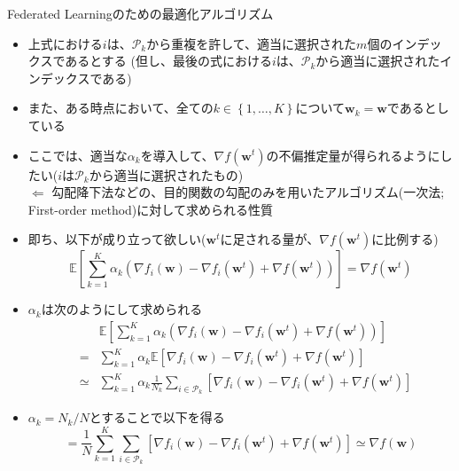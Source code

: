 \documentclass[dvipdfmx,notheorems,t]{beamer}
\begin{document}
\begin{frame}{Federated Learningのための最適化アルゴリズム}
\begin{enumerate}
\begin{itemize}
		\item 上式における$i$は、$\mathcal{P}_k$から重複を許して、適当に選択された$m$個のインデックスであるとする (但し、最後の式における$i$は、$\mathcal{P}_k$から適当に選択されたインデックスである)
		\item また、ある時点において、全ての$k \in \left\{ 1, \ldots, K \right\}$について$\bm{w}_k = \bm{w}$であるとしている
		\newline
		
		\item ここでは、適当な$\alpha_k$を導入して、$\nabla f(\bm{w}^t)$の不偏推定量が得られるようにしたい($i$は$\mathcal{P}_k$から適当に選択されたもの) \\
		$\Leftarrow$ 勾配降下法などの、目的関数の勾配のみを用いたアルゴリズム(\alert{一次法}; First-order method)に対して求められる性質
		\newline
		
		\item 即ち、以下が成り立って欲しい($\bm{w}^t$に足される量が、$\nabla f(\bm{w}^t)$に比例する)
		\begin{equation}
			\mathbb{E} \left[ \sum_{k = 1}^K \alpha_k \left( \nabla f_i(\bm{w}) - \nabla f_i(\bm{w}^t) + \nabla f(\bm{w}^t) \right) \right] = \nabla f(\bm{w}^t)
		\end{equation}
		
		\framebreak
		
		\item $\alpha_k$は次のようにして求められる
		\begin{eqnarray}
			&& \mathbb{E} \left[ \sum_{k = 1}^K \alpha_k \left( \nabla f_i(\bm{w}) - \nabla f_i(\bm{w}^t) + \nabla f(\bm{w}^t) \right) \right] \nonumber \\
			&=& \sum_{k = 1}^K \alpha_k \mathbb{E} \left[ \nabla f_i(\bm{w}) - \nabla f_i(\bm{w}^t) + \nabla f(\bm{w}^t) \right] \nonumber \\
			&\simeq& \sum_{k = 1}^K \alpha_k \frac{1}{N_k} \sum_{i \in \mathcal{P}_k} \left[ \nabla f_i(\bm{w}) - \nabla f_i(\bm{w}^t) + \nabla f(\bm{w}^t) \right]
		\end{eqnarray}
		
		\item $\alpha_k = N_k / N$とすることで以下を得る
		\begin{equation}
			= \frac{1}{N} \sum_{k = 1}^K \sum_{i \in \mathcal{P}_k} \left[ \nabla f_i(\bm{w}) - \nabla f_i(\bm{w}^t) + \nabla f(\bm{w}^t) \right] \simeq \nabla f(\bm{w}) \nonumber
		\end{equation}
		

\end{itemize}
\end{enumerate}
\end{frame}
\end{document}
